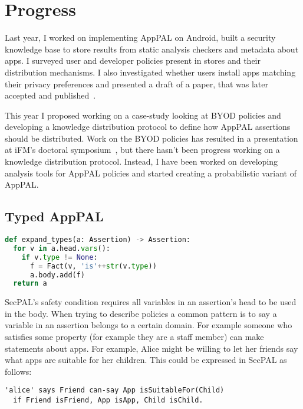 \documentclass[a4paper]{scrartcl}
\begin{document}

\section{Progress}
\label{sec:work}

Last year, I worked on implementing AppPAL on Android, built a security
knowledge base to store results from static analysis checkers and metadata about
apps. I surveyed user and developer policies present in stores and
their distribution mechanisms. I also investigated whether users install apps
matching their privacy preferences and presented a draft of a paper, that was
later accepted and published~\cite{hallett_apppal_2016}.

This year I proposed working on a case-study looking at BYOD policies and
developing a knowledge distribution protocol to define how AppPAL assertions
should be distributed.  Work on the BYOD policies has resulted in a presentation
at iFM's doctoral symposium~\cite{hallett_specifying_2016}, but there hasn't
been progress working on a knowledge distribution protocol.  Instead, I have been
worked on developing analysis tools for AppPAL policies and started creating a
probabilistic variant of AppPAL.

\subsection{Typed AppPAL}
\label{sec:types}

\begin{lstlisting}[language=Python, float, caption={Procedure used to expand types from AppPAL into SecPAL.}]
def expand_types(a: Assertion) -> Assertion:
  for v in a.head.vars():
    if v.type != None:
      f = Fact(v, 'is'++str(v.type))
      a.body.add(f)
  return a
\end{lstlisting}

SecPAL's safety condition requires all variables in an assertion's head to be
used in the body. When trying to describe policies a common pattern is to say a
variable in an assertion belongs to a certain domain. For example someone who
satisfies some property (for example they are a staff member) can make
statements about apps.
For example, Alice might be willing to let her friends say what apps are
suitable for her children.  This could be expressed in SecPAL as follows:

\begin{lstlisting}
'alice' says Friend can-say App isSuitableFor(Child)
  if Friend isFriend, App isApp, Child isChild.
\end{lstlisting}
\end{document}
